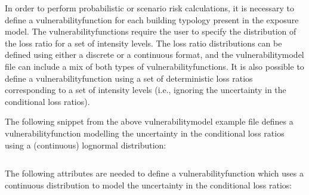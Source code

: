 In order to perform probabilistic or scenario risk calculations, it is
necessary to define a \gls{vulnerabilityfunction} for each building typology
present in the exposure model. The \glspl{vulnerabilityfunction} require the
user to specify the distribution of the loss ratio for a set of intensity
levels. The loss ratio distributions can be defined using either a discrete or
a continuous format, and the \gls{vulnerabilitymodel} file can include a mix
of both types of \glspl{vulnerabilityfunction}. It is also possible to define
a \gls{vulnerabilityfunction} using a set of deterministic loss ratios
corresponding to a set of intensity levels (i.e., ignoring the uncertainty in
the conditional loss ratios).

The following snippet from the above \gls{vulnerabilitymodel} example file defines
a \gls{vulnerabilityfunction} modelling the uncertainty in the conditional loss
ratios using a (continuous) lognormal distribution:

\inputminted[firstline=10,firstnumber=10,lastline=14,fontsize=\footnotesize,frame=single,linenos,bgcolor=lightgray]{xml}{oqum/risk/Verbatim/input_vulnerability.xml}

The following attributes are needed to define a \gls{vulnerabilityfunction} which
uses a continuous distribution to model the uncertainty in the conditional
loss ratios:

